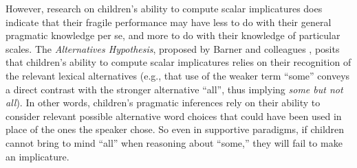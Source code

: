 \documentclass[man]{apa2}
\begin{document}
However, research on children's ability to compute scalar implicatures does indicate that their fragile performance may have less to do with their general pragmatic knowledge per se, and more to do with their knowledge of particular scales. The \emph{Alternatives Hypothesis}, proposed by Barner and colleagues \cite{barner2010, barner2011}, posits that children's ability to compute scalar implicatures relies on their recognition of the relevant lexical alternatives (e.g., that use of the weaker term ``some'' conveys a direct contrast with the stronger alternative ``all'', thus implying \emph{some but not all}).  In other words, children's pragmatic inferences rely on their ability to consider relevant possible alternative word choices that could have been used in place of the ones the speaker chose. So even in supportive paradigms, if children cannot bring to mind ``all'' when reasoning about ``some,'' they will fail to make an implicature.
\end{document}
